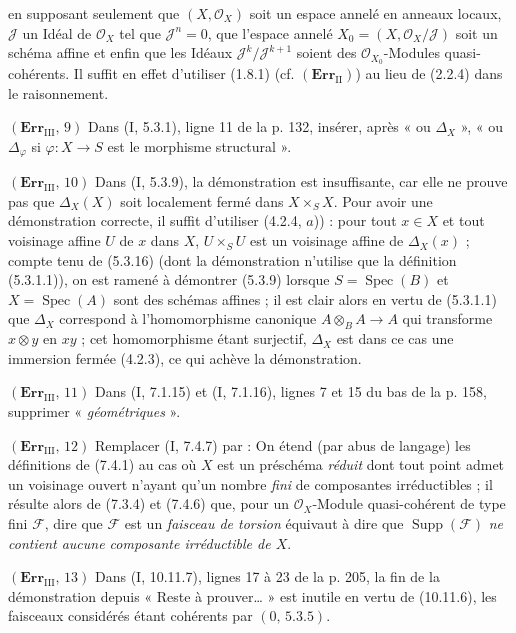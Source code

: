 en supposant seulement que $(X,\mathscr O_X)$ soit un espace annelé en anneaux
locaux, $\mathscr J$ un Idéal de $\mathscr O_X$ tel que $\mathscr J^n=0$, que
l'espace annelé $X_0=(X,\mathscr O_X/\mathscr J)$ soit un schéma affine et enfin
que les Idéaux $\mathscr J^k/\mathscr J^{k+1}$ soient des
$\mathscr O_{X_0}$-Modules quasi-cohérents. Il suffit en effet d'utiliser
(1.8.1) (cf. $(\mathbf{Err}_{\mathrm{II}})$) au lieu de (2.2.4) dans le
raisonnement.

\noindent\textbf{$(\mathbf{Err}_{\mathrm{III}},\,9)$} Dans (I, 5.3.1), ligne
11 de la p. 132, insérer, après « ou $\Delta_X$ », « ou $\Delta_\varphi$ si
$\varphi:X\to S$ est le morphisme structural ».

\noindent\textbf{$(\mathbf{Err}_{\mathrm{III}},\,10)$} Dans (I, 5.3.9), la
démonstration est insuffisante, car elle ne prouve pas que $\Delta_X(X)$ soit
localement fermé dans $X\times_SX$. Pour avoir une démonstration correcte, il
suffit d'utiliser (4.2.4, $a$)) : pour tout $x\in X$ et tout voisinage affine
$U$ de $x$ dans $X$, $U\times_SU$ est un voisinage affine de $\Delta_X(x)$ ;
compte tenu de (5.3.16) (dont la démonstration n'utilise que la définition
(5.3.1.1)), on est ramené à démontrer (5.3.9) lorsque
$S=\operatorname{Spec}(B)$ et $X=\operatorname{Spec}(A)$ sont des schémas
affines ; il est clair alors en vertu de (5.3.1.1) que $\Delta_X$ correspond à
l'homomorphisme canonique $A\otimes_BA\to A$ qui transforme $x\otimes y$ en
$xy$ ; cet homomorphisme étant surjectif, $\Delta_X$ est dans ce cas une
immersion fermée (4.2.3), ce qui achève la démonstration.

\noindent\textbf{$(\mathbf{Err}_{\mathrm{III}},\,11)$} Dans (I, 7.1.15) et
(I, 7.1.16), lignes 7 et 15 du bas de la p. 158, supprimer
« \emph{géométriques} ».

\noindent\textbf{$(\mathbf{Err}_{\mathrm{III}},\,12)$} Remplacer (I, 7.4.7)
par : On étend (par abus de langage) les définitions de (7.4.1) au cas où
$X$ est un préschéma \emph{réduit} dont tout point admet un voisinage ouvert
n'ayant qu'un nombre \emph{fini} de composantes irréductibles ; il résulte
alors de (7.3.4) et (7.4.6) que, pour un $\mathscr O_X$-Module quasi-cohérent de
type fini $\mathscr F$, dire que $\mathscr F$ est un \emph{faisceau de torsion}
équivaut à dire que $\operatorname{Supp}(\mathscr F)$ \emph{ne contient aucune
composante irréductible de $X$}.

\noindent\textbf{$(\mathbf{Err}_{\mathrm{III}},\,13)$} Dans (I, 10.11.7),
lignes 17 à 23 de la p. 205, la fin de la démonstration depuis « Reste à
prouver\ldots{} » est inutile en vertu de (10.11.6), les faisceaux considérés
étant cohérents par $(0,\,5.3.5)$.

